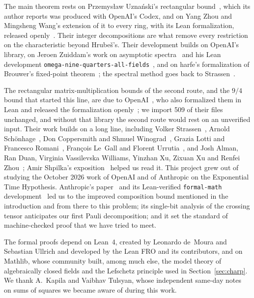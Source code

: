 \documentclass[11pt]{article}
\theoremstyle{definition}
\theoremstyle{remark}
\begin{document}
The main theorem rests on Przemys\l{}aw Uzna\'nski's rectangular bound~\cite{Uznanski2026}, which its author
reports was produced with OpenAI's Codex, and on Yang Zhou and Mingsheng Wang's extension of it to every ring, with
its Lean formalization, released openly~\cite{ZhouWang2026}. Their integer decompositions are what remove every
restriction on the characteristic beyond Hrube\v{s}'s. Their development builds on OpenAI's library, on Jeroen
Zuiddam's work on asymptotic spectra~\cite{Zuiddam2020} and his Lean development
\texttt{omega-nine-quarters-all-fields}~\cite{Zuiddam2026}, and on harfe's formalization of Brouwer's fixed-point theorem~\cite{harfe2026}; the
spectral method goes back to Strassen~\cite{Strassen1988}.

The rectangular matrix-multiplication bounds of the second route, and the $9/4$ bound that started this line, are
due to OpenAI~\cite{OAI2026b,OAI2026a}, who
also formalized them in Lean and released the formalization openly~\cite{OAI2026lean}; we import 509 of their files
unchanged, and without that library the second route would rest on an unverified input. Their work builds on a long line, including Volker Strassen~\cite{Strassen1969,Strassen1973}, Arnold
Sch\"onhage~\cite{Schonhage1981}, Don Coppersmith and Shmuel Winograd~\cite{CoppersmithWinograd1990}, Grazia
Lotti and Francesco Romani~\cite{LottiRomani1983}, Fran\c{c}ois Le~Gall and Florent
Urrutia~\cite{LeGallUrrutia2018}, and Josh Alman, Ran Duan, Virginia Vassilevska Williams, Yinzhan Xu, Zixuan Xu
and Renfei Zhou~\cite{ADVWXXZ2024}; Amir Shpilka's exposition~\cite{Shpilka2026} helped us read it. This project grew out of
studying the October 2026 work of OpenAI and of Anthropic on the Exponential Time Hypothesis. Anthropic's
paper~\cite{Anthropic3SAT} and its Lean-verified \texttt{formal-math} development~\cite{AnthropicFormalMath} led
us to the improved composition bound mentioned in the introduction and from there to this problem; its single-bit
analysis of the crossing tensor anticipates our first Pauli decomposition; and it set the standard of
machine-checked proof that we have tried to meet.

The formal proofs depend on Lean~4, created by Leonardo de~Moura and Sebastian Ullrich and developed by the Lean
FRO and its contributors, and on Mathlib, whose community built, among much else, the model theory of algebraically
closed fields and the Lefschetz principle used in Section~\ref{sec:charp}. We thank A.~Kapila and Vaibhav Tulsyan, whose independent same-day notes~\cite{Kapila2026,Tulsyan2026} on
sums of squares we became aware of during this work.
\end{document}
